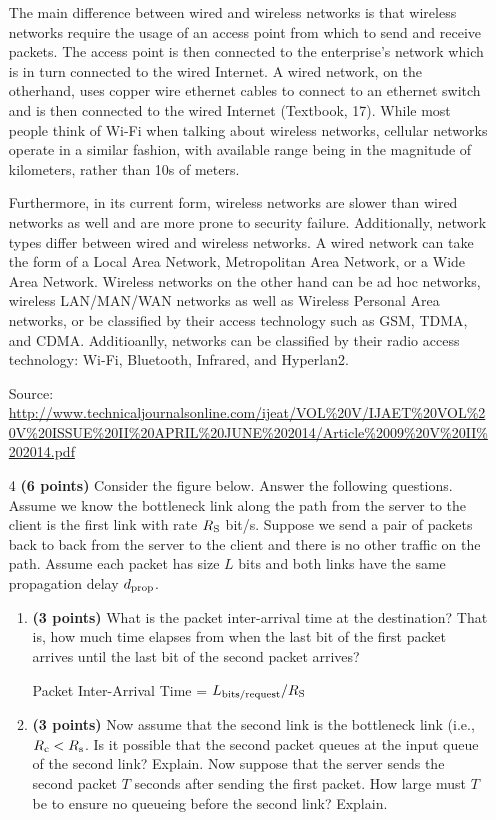 \documentclass{article}
\begin{document}
\begin{enumerate}
The main difference between wired and wireless networks is that wireless networks require the usage of an access point from which to send and receive packets. The access point is then connected to the enterprise's network which is in turn connected to the wired Internet. A wired network, on the otherhand, uses copper wire ethernet cables to connect to an ethernet switch and is then connected to the wired Internet (Textbook, 17). While most people think of Wi-Fi when talking about wireless networks, cellular networks operate in a similar fashion, with available range being in the magnitude of kilometers, rather than 10s of meters.

Furthermore, in its current form, wireless networks are slower than wired networks as well and are more prone to security failure. Additionally, network types differ between wired and wireless networks. A wired network can take the form of a Local Area Network, Metropolitan Area Network, or a Wide Area Network. Wireless networks on the other hand can be ad hoc networks, wireless LAN/MAN/WAN networks as well as Wireless Personal Area networks, or be classified by their access technology such as GSM, TDMA, and CDMA. Additioanlly, networks can be classified by their radio access technology: Wi-Fi, Bluetooth, Infrared, and Hyperlan2. 

Source: \url{http://www.technicaljournalsonline.com/ijeat/VOL\%20V/IJAET\%20VOL\%20V\%20ISSUE\%20II\%20APRIL\%20JUNE\%202014/Article\%2009\%20V\%20II\%202014.pdf}

\item[4]\textbf{(6 points)} Consider the figure below. Answer the following questions. Assume we know the bottleneck link along the path from the server to the client is the first link with rate $R\textsubscript{S}$ bit/s. Suppose we send a pair of packets back to back from the server to the client and there is no other traffic on the path. Assume each packet has size $L$ bits and both links have the same propagation delay $d\textsubscript{prop}$.

\begin{enumerate}
\item \textbf{(3 points)} What is the packet inter-arrival time at the destination? That is, how much time elapses from when the last bit of the first packet arrives until the last bit of the second packet arrives?

	Packet Inter-Arrival Time = $ L\textsubscript{bits/request}/R\textsubscript{S}$


\item \textbf{(3 points)} Now assume that the second link is the bottleneck link (i.e., $R\textsubscript{c} < R\textsubscript{s}$. Is it possible that the second packet queues at the input queue of the second link? Explain. Now suppose that the server sends the second packet $T$ seconds after sending the first packet. How large must $T$ be to ensure no queueing before the second link? Explain.  


\end{enumerate}
\end{enumerate}
\end{document}
